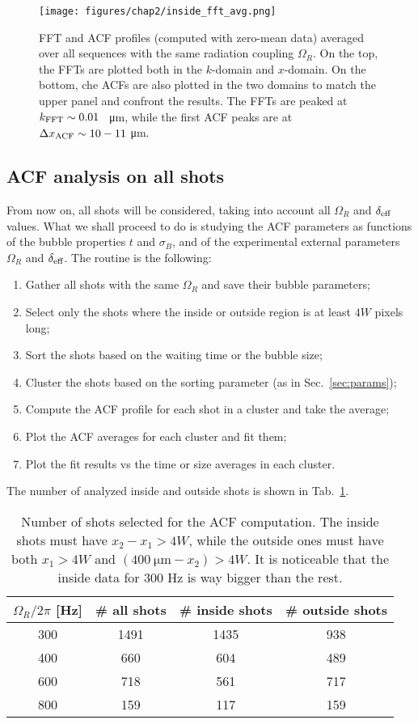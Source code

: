 \begin{figure}[t!]
    \centering
    \texttt{[image: figures/chap2/inside\_fft\_avg.png]}
    \caption{FFT and ACF profiles (computed with zero-mean data) averaged over all sequences with the same radiation coupling $\Omega_R$. On the top, the FFTs are plotted both in the $k$-domain and $x$-domain. On the bottom, che ACFs are also plotted in the two domains to match the upper panel and confront the results.
    The FFTs are peaked at $k_{\rm FFT} \sim 0.01$ \unit{\per\micro\meter}, while the first ACF peaks are at $\Delta x_{\rm ACF} \sim 10-11$ \unit{\micro\meter}.}
    \label{fig:inside_avg}
\end{figure}

\subsection{ACF analysis on all shots}
From now on, all shots will be considered, taking into account all $\Omega_R$ and $\delta_{\rm eff}$ values. What we shall proceed to do is studying the ACF parameters as functions of the bubble properties $t$ and $\sigma_B$, and of the experimental external parameters $\Omega_R$ and $\delta_{\rm eff}$.
The routine is the following:
\begin{enumerate}
    \item Gather all shots with the same $\Omega_R$ and save their bubble parameters;
    \item Select only the shots where the inside or outside region is at least $4W$ pixels long;
    \item Sort the shots based on the waiting time or the bubble size;
    \item Cluster the shots based on the sorting parameter (as in Sec.\ \ref{sec:params});
    \item Compute the ACF profile for each shot in a cluster and take the average;
    \item Plot the ACF averages for each cluster and fit them;
    \item Plot the fit results vs the time or size averages in each cluster.
\end{enumerate}
The number of analyzed inside and outside shots is shown in Tab.\ \ref{tab:shots}.
\begin{table}[ht!]
    \centering
    \begin{tabular}{c|c|c|c}
        $\Omega_R/2\pi$ [\unit{\hertz}] & \# all shots & \# inside shots & \# outside shots \\
        \hline
        300 & 1491 & 1435 & 938\\   
        400 & 660 & 604 & 489\\
        600 & 718 & 561 & 717\\
        800 & 159 & 117 & 159\\     
    \end{tabular}
    \caption{Number of shots selected for the ACF computation. The inside shots must have $x_2-x_1 > 4W$, while the outside ones must have both $x_1 > 4W$ and $(400\ \unit{\micro\meter} - x_2) > 4W$. It is noticeable that the inside data for 300 \unit{\hertz} is way bigger than the rest.}
    \label{tab:shots}
\end{table}
